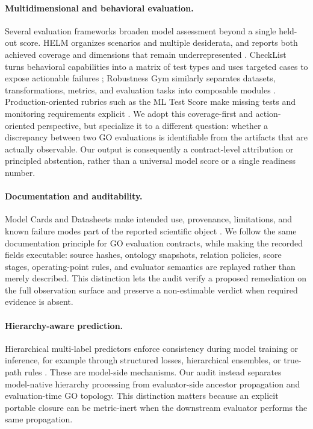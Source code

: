 \documentclass[11pt]{article}
\begin{document}
\paragraph{Multidimensional and behavioral evaluation.}
Several evaluation frameworks broaden model assessment beyond a single held-out score. HELM organizes scenarios and multiple desiderata, and reports both achieved coverage and dimensions that remain underrepresented \citep{liang2022helm}. CheckList turns behavioral capabilities into a matrix of test types and uses targeted cases to expose actionable failures \citep{ribeiro2020checklist}; Robustness Gym similarly separates datasets, transformations, metrics, and evaluation tasks into composable modules \citep{goel2021robustnessgym}. Production-oriented rubrics such as the ML Test Score make missing tests and monitoring requirements explicit \citep{breck2017mltestscore}. We adopt this coverage-first and action-oriented perspective, but specialize it to a different question: whether a discrepancy between two GO evaluations is identifiable from the artifacts that are actually observable. Our output is consequently a contract-level attribution or principled abstention, rather than a universal model score or a single readiness number.

\paragraph{Documentation and auditability.}
Model Cards and Datasheets make intended use, provenance, limitations, and known failure modes part of the reported scientific object \citep{mitchell2019modelcards,gebru2021datasheets}. We follow the same documentation principle for GO evaluation contracts, while making the recorded fields executable: source hashes, ontology snapshots, relation policies, score stages, operating-point rules, and evaluator semantics are replayed rather than merely described. This distinction lets the audit verify a proposed remediation on the full observation surface and preserve a non-estimable verdict when required evidence is absent.

\paragraph{Hierarchy-aware prediction.}
Hierarchical multi-label predictors enforce consistency during model training or inference, for example through structured losses, hierarchical ensembles, or true-path rules \citep{barutcuoglu2006hierarchical,schietgat2010hierarchical,valentini2011truepath,giunchiglia2020coherent}. These are model-side mechanisms. Our audit instead separates model-native hierarchy processing from evaluator-side ancestor propagation and evaluation-time GO topology. This distinction matters because an explicit portable closure can be metric-inert when the downstream evaluator performs the same propagation.
\end{document}
